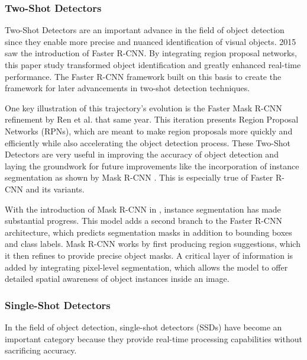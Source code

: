 \documentclass{IEEEtran}
\begin{document}
	
	\subsubsection{Two-Shot Detectors}
	Two-Shot Detectors are an important advance in the field of object detection since they enable more precise and nuanced identification of visual objects. 2015 saw the introduction of Faster R-CNN\cite{fastrcnn}. By integrating region proposal networks, this paper study transformed object identification and greatly enhanced real-time performance. The Faster R-CNN framework built on this basis to create the framework for later advancements in two-shot detection techniques.
	
	One key illustration of this trajectory's evolution is the Faster Mask R-CNN refinement by Ren et al. \cite{fasterrcnn} that same year. This iteration presents Region Proposal Networks (RPNs), which are meant to make region proposals more quickly and efficiently while also accelerating the object detection process. These Two-Shot Detectors are very useful in improving the accuracy of object detection and laying the groundwork for future improvements like the incorporation of instance segmentation as shown by Mask R-CNN \cite{maskrcnn}. This is especially true of Faster R-CNN and its variants.
	
	With the introduction of Mask R-CNN in \cite{maskrcnn}, instance segmentation has made substantial progress. This model adds a second branch to the Faster R-CNN architecture, which predicts segmentation masks in addition to bounding boxes and class labels. Mask R-CNN works by first producing region suggestions, which it then refines to provide precise object masks. A critical layer of information is added by integrating pixel-level segmentation, which allows the model to offer detailed spatial awareness of object instances inside an image.
	
	\subsubsection{Single-Shot Detectors}
	In the field of object detection, single-shot detectors (SSDs) have become an important category because they provide real-time processing capabilities without sacrificing accuracy.
	
\end{document}
